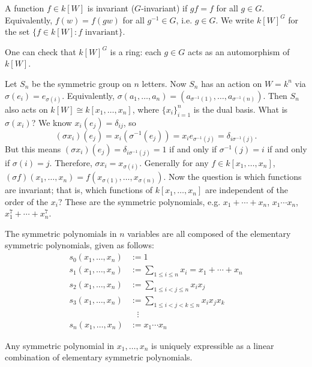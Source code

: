 \begin{dfn}
A function $f \in k[W]$ is invariant ($G$-invariant) if $gf=f$ for all $g \in G$. Equivalently, $f(w)=f(gw)$ for all $g^{-1} \in G$, i.e. $g \in G$. We write $k[W]^G$ for the set $\{ f \in k[W] \colon f \text{ invariant}\}$.
\end{dfn}


One can check that $k[W]^G$ is a ring: each $g \in G$ acts as an automorphism of $k[W]$. 


\begin{ex}
Let $S_n$ be the symmetric group on $n$ letters. Now $S_n$ has an action on $W=k^n$ via $\sigma(e_i)=e_{\sigma(i)}$. Equivalently, $\sigma(a_1,\ldots,a_n)=(a_{\sigma^{-1}(1)}, \ldots, a_{\sigma^{-1}(n)})$. Then $S_n$ also acts on $k[W] \cong k[x_1,\ldots,x_n]$, where $\{x_i\}_{i=1}^n$ is the dual basis. What is $\sigma(x_i)$? We know $x_i(e_j)=\delta_{ij}$, so 
	\[
	(\sigma x_i)(e_j)=x_i(\sigma^{-1}(e_j))=x_ie_{\sigma^{-1}(j)}=\delta_{i \sigma^{-1}(j)}.
	\] 
But this means $(\sigma x_i)(e_j)=\delta_{i \sigma^{-1}(j)}=1$ if and only if $\sigma^{-1}(j)=i$ if and only if $\sigma(i)=j$. Therefore, $\sigma x_i= x_{\sigma(i)}$. Generally for any $f \in k[x_1,\ldots,x_n]$, $(\sigma f)(x_1,\ldots,x_n)= f(x_{\sigma(1)},\ldots,x_{\sigma(n)})$. Now the question is which functions are invariant; that is, which functions of $k[x_1,\ldots,x_n]$ are independent of the order of the $x_i$? These are the symmetric polynomials, e.g. $x_1+\cdots+x_n$, $x_1\cdots x_n$, $x_1^7+\cdots+x_n^7$. \xqed
\end{ex}


The symmetric polynomials in $n$ variables are all composed of the elementary symmetric polynomials, given as follows:
	\[
	\begin{split}
	s_0(x_1,\ldots,x_n)&:= 1 \\
	s_1(x_1,\ldots,x_n)&:= \sum_{1 \leq i \leq n} x_i=  x_1 + \cdots + x_n \\
	s_2(x_1,\ldots,x_n)&:= \sum_{1 \leq i<j \leq n} x_i x_j \\
	s_3(x_1,\ldots,x_n)&:= \sum_{1 \leq i<j<k \leq n} x_i x_j x_k \\
	&\;\;\;\vdots \\
	s_n(x_1,\ldots,x_n)&:= x_1\cdots x_n
	\end{split}
	\]


\begin{thm} \label{thm:fundone}
Any symmetric polynomial in $x_1,\ldots,x_n$ is uniquely expressible as a linear combination of elementary symmetric polynomials. 
\end{thm}


